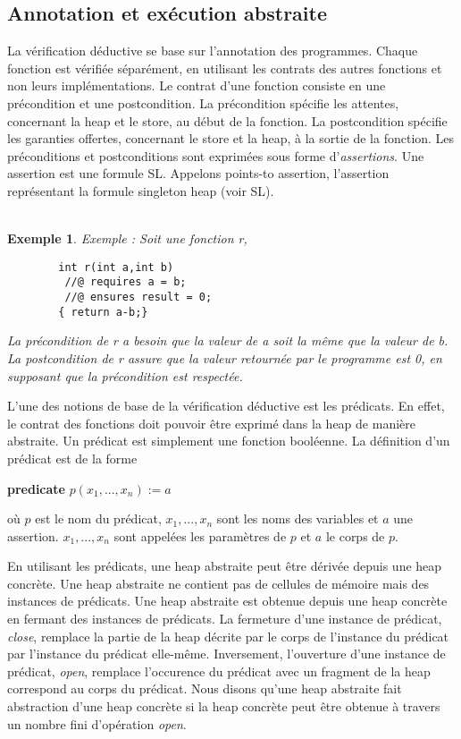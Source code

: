 \documentclass[11pt,openany]{article}
\newtheorem{exemple}{Exemple}
\begin{document}
	\subsection{Annotation et ex\'ecution abstraite}
		La v\'erification d\'eductive se base sur l'annotation des programmes. Chaque fonction est v\'erifi\'ee s\'epar\'ement, en utilisant les contrats des autres fonctions et non leurs impl\'ementations. Le contrat d'une fonction consiste en une pr\'econdition et une postcondition. La pr\'econdition sp\'ecifie les attentes, concernant la heap et le store, au d\'ebut de la fonction. La postcondition sp\'ecifie les garanties offertes, concernant le store et la heap, \`a la sortie de la fonction. Les pr\'econditions et postconditions sont exprim\'ees sous forme d'\textit{assertions}. Une assertion est une formule SL. Appelons points-to assertion, l'assertion repr\'esentant la formule singleton heap (voir SL).\\ \\
		\begin{exemple}
		Exemple : Soit une fonction r,
		\begin{lstlisting}
		int r(int a,int b)
		 //@ requires a = b;
		 //@ ensures result = 0;
		{ return a-b;}
		\end{lstlisting}
		La pr\'econdition de r a besoin que la valeur de a soit la m\^eme que la valeur de b. La postcondition de r assure que la valeur retourn\'ee par le programme est 0, en supposant que la pr\'econdition est respect\'ee.
		\end{exemple}
	L'une des notions de base de la v\'erification d\'eductive est les pr\'edicats. En effet, le contrat des fonctions doit pouvoir \^etre exprim\'e dans la heap de mani\`ere abstraite. Un pr\'edicat est simplement une fonction bool\'eenne. La d\'efinition d'un pr\'edicat est de la forme
	\begin{center}
	
\textbf{predicate} $p(x_1,...,x_n):=a$

	\end{center}
o\`u $p$ est le nom du pr\'edicat, $x_1,...,x_n$ sont les noms des variables et $a$ une assertion. $x_1,...,x_n$ sont appel\'ees les param\`etres de $p$ et $a$ le corps de $p$.\par
	En utilisant les pr\'edicats, une heap abstraite peut \^etre d\'eriv\'ee depuis une heap concr\`ete. Une heap abstraite ne contient pas de cellules de m\'emoire mais des instances de pr\'edicats. Une heap abstraite est obtenue depuis une heap concr\`ete en fermant des instances de pr\'edicats. La fermeture d'une instance de pr\'edicat, \textit{close}, remplace la partie de la heap d\'ecrite par le corps de l'instance du pr\'edicat par l'instance du pr\'edicat elle-m\^eme. Inversement, l'ouverture d'une instance de pr\'edicat, \textit{open}, remplace l'occurence du pr\'edicat avec un fragment de la heap correspond au corps du pr\'edicat. Nous disons qu'une heap abstraite fait abstraction d'une heap concr\`ete si la heap concr\`ete peut \^etre obtenue \`a travers un nombre fini d'op\'eration \textit{open}.\\ 
\end{document}
